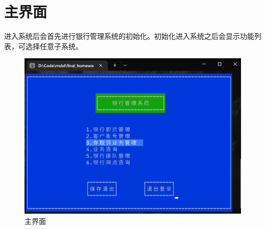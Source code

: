 \documentclass{ctexrep}
\begin{document}
\section{主界面}
进入系统后会首先进行银行管理系统的初始化。初始化进入系统之后会显示功能列表，可选择任意子系统。
\begin{figure}[H]
  \centering\includegraphics[scale=0.6]{main_meun.png}
  \caption{主界面}
\end{figure}
\end{document}
